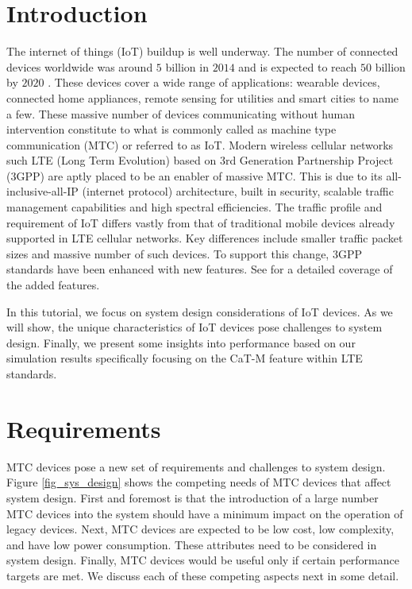 \documentclass[conference,compsoc]{IEEEtran}
\begin{document}
\section{Introduction}
The internet of things (IoT) buildup is well underway. The number of connected devices worldwide was around $5$ billion in $2014$ and is expected to reach $50$ billion by $2020$ \cite{mach_research}. These devices cover a wide range of applications:  wearable devices, connected home appliances, remote sensing for utilities and smart cities to name a few. These massive number of devices communicating without human intervention constitute to what is commonly called as machine type communication (MTC) or referred to as IoT. Modern wireless cellular networks such LTE (Long Term Evolution) based on 3rd Generation Partnership Project (3GPP) are aptly placed to be an enabler of massive MTC. This is due to its all-inclusive-all-IP (internet protocol) architecture, built in security, scalable traffic management capabilities and high spectral efficiencies.
The traffic profile and requirement of IoT differs vastly from that of traditional mobile devices already supported in LTE cellular networks. Key differences include smaller traffic packet sizes and massive number of such devices. To support this change, $3$GPP standards have been enhanced with new features. See \cite{alberto,36_888} for a detailed coverage of the added features.

In this tutorial, we focus on system design considerations of IoT devices. As we will show, the unique characteristics of IoT devices pose challenges to system design. Finally, we present some insights into performance based on our simulation results specifically focusing on the CaT-M feature within LTE standards. 


 

\section{Requirements}
MTC devices pose a new set of requirements and challenges \cite{adyson} to system design. Figure \ref{fig_sys_design} shows the competing needs of MTC devices that affect system design. First and foremost is that the introduction of a large number MTC devices into the system should have a minimum impact on the operation of legacy devices. Next, MTC devices are expected to be low cost, low complexity, and have low power consumption. These attributes need to be considered in system design. Finally, MTC devices would be useful only if certain performance targets are met. We discuss each of these competing aspects next in some detail.
\end{document}
